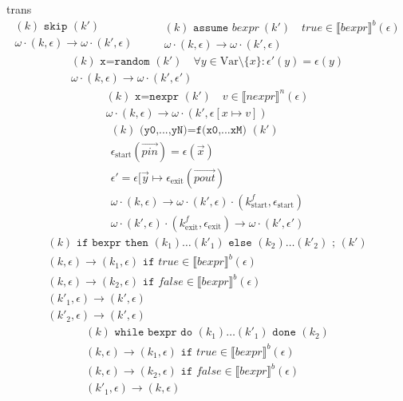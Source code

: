 \documentclass[a4paper,11pt]{article}
\newcommand{\sem}[1]{\llbracket #1 \rrbracket}
\begin{document}
\W\htmlonly{\begin{quote}}
\begin{image}{trans}
  $$
  \begin{array}{c}
    (k) \texttt{~skip~} (k') \\ \hline
    \omega\cdot (k,\epsilon) \rightarrow \omega\cdot (k',\epsilon)
  \end{array}
  \qquad
  \begin{array}{c}
    (k) \texttt{~assume~} bexpr ~ (k') \quad true\in\sem{bexpr}^b(\epsilon) \\ \hline
    \omega\cdot (k,\epsilon) \rightarrow \omega\cdot (k',\epsilon)
  \end{array}
  $$
  $$
  \begin{array}{c}
    (k) \texttt{~x=random~} (k') \quad \forall y\in\mathrm{Var}\setminus\{x\}:\epsilon'(y)=\epsilon(y) \\ \hline
    \omega\cdot (k,\epsilon) \rightarrow \omega\cdot (k',\epsilon')
  \end{array}
  $$
  $$
  \begin{array}{c}
    (k) \texttt{~x=nexpr~} (k') \quad v\in\sem{nexpr}^n(\epsilon)  \\ \hline
    \omega\cdot (k,\epsilon) \rightarrow \omega\cdot (k',\epsilon[x\mapsto v])
  \end{array}
  $$
  $$
  \begin{array}{c}
    (k) \texttt{~(y0,...,yN)=f(x0,...xM)~} (k') \\
    \epsilon_\mathrm{start}(\vec{pin}) = \epsilon(\vec{x}) \\
    \epsilon' = \epsilon[\vec{y} \mapsto \epsilon_\mathrm{exit}(\vec{pout}) \\ \hline
    \omega\cdot (k,\epsilon) \rightarrow \omega\cdot (k',\epsilon) \cdot (k^f_\mathrm{start},\epsilon_\mathrm{start}) \\
     \omega\cdot (k',\epsilon) \cdot (k^f_\mathrm{exit},\epsilon_\mathrm{exit})
     \rightarrow
     \omega\cdot (k',\epsilon')
  \end{array}
  $$
  $$
  \begin{array}{c}
    (k) \texttt{~if bexpr then~} (k_1)\ldots(k'_1) \texttt{~else~} (k_2)\ldots (k'_2) \texttt{~;~} (k')\\ \hline
    (k,\epsilon) \rightarrow (k_1,\epsilon) \texttt{~if~} true\in\sem{bexpr}^b(\epsilon) \\
    (k,\epsilon) \rightarrow (k_2,\epsilon) \texttt{~if~} false\in\sem{bexpr}^b(\epsilon) \\
    (k'_1,\epsilon) \rightarrow (k',\epsilon) \\
    (k'_2,\epsilon) \rightarrow (k',\epsilon)
  \end{array}
  $$
  $$
  \begin{array}{c}
    (k) \texttt{~while bexpr do~} (k_1)\ldots(k'_1) \texttt{~done~} (k_2)\\ \hline
    (k,\epsilon) \rightarrow (k_1,\epsilon) \texttt{~if~} true\in\sem{bexpr}^b(\epsilon) \\
    (k,\epsilon) \rightarrow (k_2,\epsilon) \texttt{~if~} false\in\sem{bexpr}^b(\epsilon) \\
    (k'_1,\epsilon) \rightarrow (k,\epsilon)
  \end{array}
  $$
\end{image}
\end{document}
